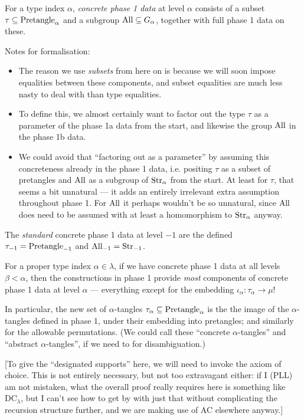 \begin{definition}
  \label{def:concrete-phase-1-data}
  For a type index $\alpha$, \emph{concrete phase 1 data} at level $\alpha$ consists of a subset $\tau \subseteq \mathrm{Pretangle}_\alpha$ and a subgroup $\mathrm{All} \subseteq G_\alpha$, together with full phase 1 data on these.

  Notes for formalisation:
  \begin{itemize}
    \item The reason we use \emph{subsets} from here on is because we will soon impose equalities between these components, and subset equalities are much less nasty to deal with than type equalities.
    \item To define this, we almost certainly want to factor out the type $\tau$ as a parameter of the phase 1a data from the start, and likewise the group $\mathrm{All}$ in the phase 1b data.
    \item We could avoid that “factoring out as a parameter” by assuming this concreteness already in the phase 1 data, i.e. positing $\tau$ as a subset of pretangles and $\mathrm{All}$ as a subgroup of $\mathrm{Str}_\alpha$ from the start.  At least for $\tau$, that seems a bit unnatural — it adds an entirely irrelevant extra assumption throughout phase 1.  For $\mathrm{All}$ it perhaps wouldn’t be so unnatural, since $\mathrm{All}$ does need to be assumed with at least a homomorphism to $\mathrm{Str}_\alpha$ anyway.
  \end{itemize}

  The \emph{standard} concrete phase 1 data at level $-1$ are the defined $\tau_{-1} = \mathrm{Pretangle}_{-1}$ and $\mathrm{All}_{-1} = \mathrm{Str}_{-1}$.
\end{definition}

\begin{definition}
  \label{def:concrete-phase-1-data-propagates}
  For a proper type index $\alpha \in \lambda$, if we have concrete phase 1 data at all levels $\beta < \alpha$, then the constructions in phase 1 provide \emph{most} components of concrete phase 1 data at level $\alpha$ — everything except for the embedding $\iota_\alpha : \tau_\alpha \to \mu$!

  In particular, the new set of $\alpha$-tangles $\tau_\alpha \subseteq \mathrm{Pretangle}_\alpha$ is the the image of the $\alpha$-tangles defined in phase 1, under their embedding into pretangles; and similarly for the allowable permutations.  (We could call these “concrete $\alpha$-tangles” and “abstract $\alpha$-tangles”, if we need to for disambiguation.)

  [To give the “designated supports” here, we will need to invoke the axiom of choice.  This is not entirely necessary, but not too extravagant either: if I (PLL) am not mistaken, what the overall proof really requires here is something like $\mathrm{DC}_\lambda$, but I can’t see how to get by with just that without complicating the recursion structure further, and we are making use of AC elsewhere anyway.]
\end{definition}

